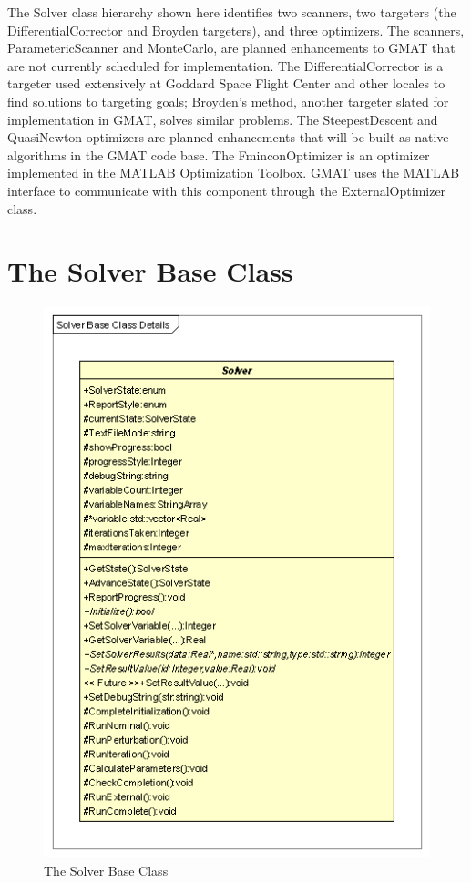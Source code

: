 The Solver class hierarchy shown here identifies two scanners, two targeters (the
DifferentialCorrector and Broyden targeters), and three optimizers.  The scanners,
ParametericScanner and MonteCarlo, are planned enhancements to GMAT that are not currently scheduled
for implementation.  The DifferentialCorrector is a targeter used extensively at Goddard Space
Flight Center and other locales to find solutions to targeting goals; Broyden's method, another
targeter slated for implementation in GMAT, solves similar problems.  The SteepestDescent and
QuasiNewton optimizers are planned enhancements that will be built as native algorithms in the
GMAT code base.  The FminconOptimizer is an optimizer implemented in the MATLAB Optimization
Toolbox.  GMAT uses the MATLAB interface to communicate with this component through the
ExternalOptimizer class.

\section{The Solver Base Class}

\begin{figure}[ht]
\begin{center}
\includegraphics[250,357]{Images/SolverBaseClassDetails.png}
\caption{\label{figure:SolverBaseClass}The Solver Base Class}
\end{center}
\end{figure}

